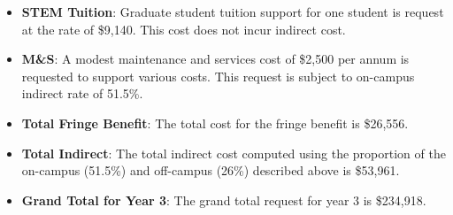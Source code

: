 \begin{enumerate}
\begin{itemize}[noitemsep,nolistsep]
{It is worthwhile to note that this increase in travel cost request compared to year 1 is offset by the reduction in the indirect cost, thanks to taking advantage of the 26\% off-campus rate.}

\item {{\bf STEM Tuition}: Graduate student tuition support for one student is request at the rate of \$9,140.  This cost does not incur indirect cost.}

\item {{\bf M\&S}: A modest maintenance and services cost of \$2,500 per annum is requested to support various costs.   This request is subject to on-campus indirect rate of 51.5\%.}

\item {{\bf Total Fringe Benefit}: The total cost for the fringe benefit is \$26,556.}
\item {{\bf Total Indirect}: The total indirect cost computed using the proportion of the on-campus (51.5\%) and off-campus (26\%) described above is \$53,961.}
\item {{\bf Grand Total for Year 3}: The grand total request for year 3 is \$234,918.}

\end{itemize}
\end{enumerate}
